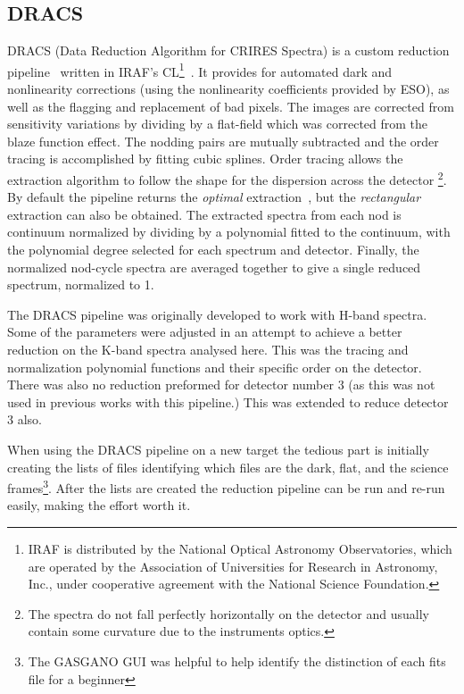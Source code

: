 \subsection{DRACS}
\label{subsec:dracs}
DRACS (Data Reduction Algorithm for CRIRES Spectra) is a custom reduction pipeline~\citep{figueira_radial_2010} written in IRAF's CL\footnote{IRAF is distributed by the National Optical Astronomy Observatories, which are operated by the Association of Universities for Research in Astronomy, {Inc.}, under cooperative agreement with the National Science Foundation.}~\citep{tody_iraf_1993}. It provides for automated dark and nonlinearity corrections (using the nonlinearity coefficients provided by ESO), as well as the flagging and replacement of bad pixels. The images are corrected from sensitivity variations by dividing by a flat-field which was corrected from the blaze function effect. The nodding pairs are mutually subtracted and the order tracing is accomplished by fitting cubic splines. Order tracing allows the extraction algorithm to follow the shape for the dispersion across the detector \footnote{The spectra do not fall perfectly horizontally on the detector and usually contain some curvature due to the instruments optics.}.
By default the pipeline returns the \emph{optimal }extraction~\citep{horne_optimal_1986}, but the \emph{rectangular} extraction can also be obtained. The extracted spectra from each nod is continuum normalized by dividing by a polynomial fitted to the continuum, with the polynomial degree selected for each spectrum and detector. Finally, the normalized nod-cycle spectra are averaged together to give a single reduced spectrum, normalized to 1.

The DRACS pipeline was originally developed to work with H-band spectra. Some of the parameters were adjusted in an attempt to achieve a better reduction on the K-band spectra analysed here. This was the tracing and normalization polynomial functions and their specific order on the detector. There was also no reduction preformed for detector number 3 (as this was not used in previous works with this pipeline.) This was extended to reduce detector 3 also.

When using the DRACS pipeline on a new target the tedious part is initially creating the lists of files identifying which files are the dark, flat, and the science frames\footnote{The GASGANO GUI was helpful to help identify the distinction of each fits file for a beginner}. After the lists are created the reduction pipeline can be run and re-run easily, making the effort worth it.

